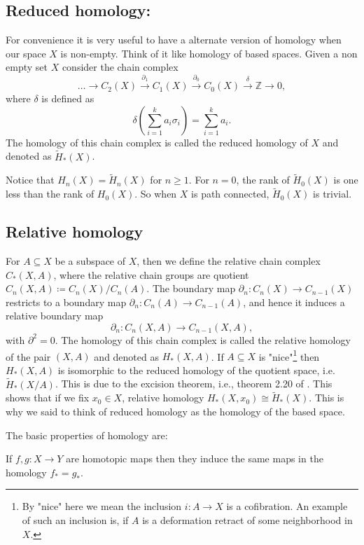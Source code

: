 \subsection{Reduced homology:}
For convenience it is very useful to have a alternate version of homology when our space \(X\) is non-empty.
Think of it like homology of based spaces.
Given a non empty set \(X\) consider the chain complex
\[\dots \to C_2(X) \xrightarrow{\partial_1} C_1(X) \xrightarrow{\partial_0} C_0(X) \xrightarrow{\delta} \mathbb{Z} \to 0,\]
where \(\delta\) is defined as 
\[\delta\left(\sum_{i=1}^k a_i\sigma_i\right) = \sum_{i=1}^k a_i.\]
The homology of this chain complex is called the reduced homology of \(X\) and denoted as \(\tilde H_\ast(X)\).

Notice that \(H_n(X) = \tilde H_n(X)\) for \(n \geq 1\).
For \(n =0\), the rank of \(\tilde{H}_0(X)\) is one less than the rank of \(H_0(X)\).
So when \(X\) is path connected, \(\tilde{H}_0(X)\) is trivial.

\subsection{Relative homology}
For \(A \subseteq X\) be a subspace of \(X\), then we define the relative chain complex \(C_\ast(X,A)\), where the relative chain groups are quotient \(C_n(X,A) \coloneq C_n(X)/C_n(A)\).
The boundary map \(\partial_n: C_n(X) \to C_{n-1}(X)\) restricts to a boundary map \(\partial_n: C_n(A) \to C_{n-1}(A)\), and hence it induces a relative boundary map 
\[\partial_n: C_n(X,A) \to C_{n-1}(X,A),\]
with \(\partial^2 = 0\).
The homology of this chain complex is called the relative homology of the pair \((X,A)\) and denoted as \(H_\ast(X,A)\).
If \(A \subseteq X\) is "nice"\footnote{By "nice" here we mean the inclusion \(i: A \to X\) is a cofibration. An example of such an inclusion is, if \(A\) is a deformation retract of some neighborhood in \(X\).} then \(H_\ast(X,A)\) is isomorphic to the reduced homology of the quotient space, i.e. \(\tilde{H}_\ast(X/A)\).
This is due to the excision theorem, i.e., theorem 2.20 of \cite{Hatcher2002}.
This shows that if we fix \(x_0 \in X\), relative homology \(H_\ast(X, x_0) \cong \tilde{H}_\ast(X)\).
This is why we said to think of reduced homology as the homology of the based space.

The basic properties of homology are:

\begin{theorem}
	If \(f,g: X \to Y\) are homotopic maps then they induce the same maps in the homology \(f_\ast = g_\ast\).
\end{theorem}

